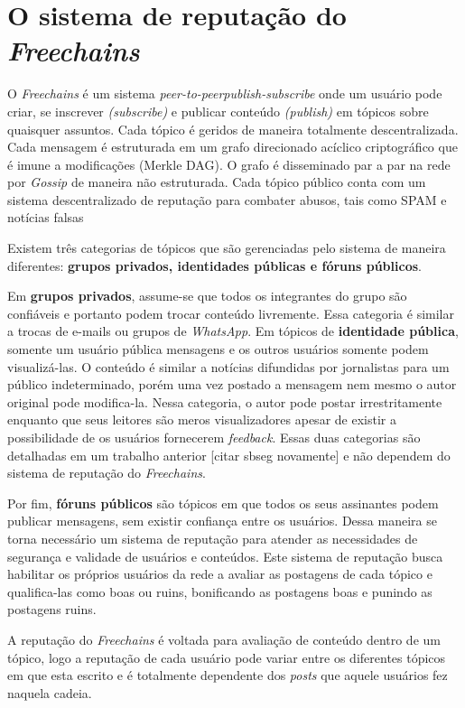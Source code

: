 \documentclass[12pt]{article}
\newcommand{\FC} {\textit{Freechains}\xspace}
\newcommand{\PtoP} {\textit{peer-to-peer}\xspace}
\begin{document}
\section{O sistema de reputação do \FC} \label{sec:freechains} 

O \FC é um sistema \PtoP \textit{publish-subscribe} onde um usuário pode criar, se inscrever \textit{(subscribe)} e publicar conteúdo \textit{(publish)} em tópicos sobre quaisquer assuntos.  
Cada tópico é geridos de maneira totalmente descentralizada.
Cada mensagem é estruturada em um grafo direcionado acíclico criptográfico que é imune a modificações (Merkle DAG). 
O grafo é disseminado par a par na rede por \textit{Gossip} de maneira não estruturada.
Cada tópico público conta com um sistema descentralizado de
reputação para combater abusos, tais como SPAM e notícias falsas

Existem três categorias de tópicos que são gerenciadas pelo sistema de maneira diferentes: \textbf{grupos privados, identidades públicas e fóruns públicos}.

Em \textbf{grupos privados}, assume-se que todos os integrantes do grupo são confiáveis e portanto podem trocar conteúdo livremente.  Essa categoria é similar a trocas de e-mails ou grupos de \textit{WhatsApp}.
Em tópicos de \textbf{identidade pública}, somente um usuário pública mensagens e os outros usuários somente podem visualizá-las.
O conteúdo é similar a notícias difundidas por jornalistas para um público indeterminado, porém uma vez postado a mensagem nem mesmo o autor original pode modifica-la.
Nessa categoria, o autor pode postar irrestritamente enquanto que seus leitores são meros visualizadores apesar de existir a possibilidade de os usuários fornecerem \textit{feedback}. Essas duas categorias são detalhadas em um trabalho anterior [citar sbseg novamente] e não dependem do sistema de reputação do \FC.

Por fim, \textbf{fóruns públicos} são tópicos em que todos os seus assinantes podem publicar mensagens, sem existir confiança entre os usuários.
Dessa maneira se torna necessário um sistema de reputação para atender as necessidades de segurança e validade de usuários e conteúdos. 
Este sistema de reputação busca habilitar os próprios usuários da rede a avaliar as postagens de cada tópico e qualifica-las como boas ou ruins, bonificando as postagens boas e punindo as postagens ruins.

A reputação do \FC é voltada para avaliação de conteúdo dentro de um tópico, logo a reputação de cada usuário pode variar entre os diferentes tópicos em que esta escrito e é totalmente dependente dos \textit{posts} que aquele usuários fez naquela cadeia. 
\end{document}
